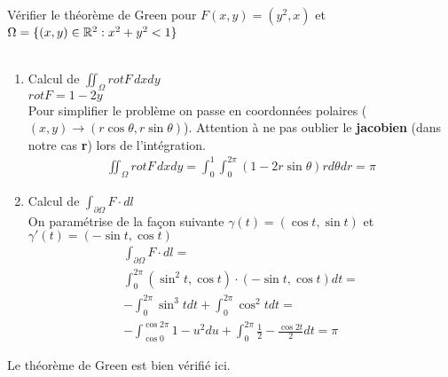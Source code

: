 \begin{myExample}
	Vérifier le théorème de Green pour $F(x,y)=(y^2,x)$ et $\Omega=\{(x,y)\in\mathbb{R}^2:x^2+y^2<1\}$
	\\\\
	\begin{enumerate}
		\item Calcul de $\iint_\Omega rot F \,dxdy$
		\\
		$rot F = 1 - 2y$
		\\Pour simplifier le problème on passe en coordonnées polaires ($(x,y)\rightarrow(r\cos\theta,r\sin\theta)$). Attention à ne pas oublier le {\bf jacobien} (dans notre cas {\bf r}) lors de l'intégration.
		\begin{eqnarray*}
			\iint_\Omega rot F \,dxdy=
			\int_0^1\int_{0}^{2\pi}(1-2r\sin\theta)r d\theta dr=
			\pi
		\end{eqnarray*}
		\item Calcul de $\int_{\partial\Omega}F\cdot dl$
		\\On paramétrise de la façon suivante $\gamma(t)=(\cos t, \sin t)$ et $\gamma'(t)=(-\sin t, \cos t)$
		\begin{eqnarray*}
			\int_{\partial\Omega}F\cdot dl=\\
			\int_{0}^{2\pi} (\sin^2 t, \cos t)\cdot(-\sin t, \cos t)dt=\\
			-\int_0^{2\pi} \sin^3tdt+\int_0^{2\pi}\cos^2tdt=\\
			-\int_{\cos 0}^{\cos 2\pi}1-u^2du+\int_0^{2\pi}\frac{1}{2}-\frac{\cos 2t}{2}dt=
			\pi
		\end{eqnarray*}
	\end{enumerate}
	Le théorème de Green est bien vérifié ici.
\end{myExample}

